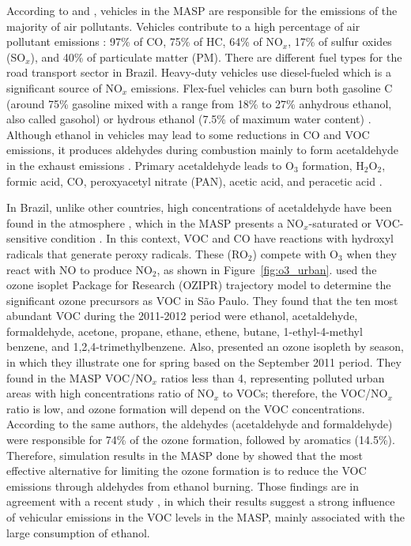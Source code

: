 According to \citet{CETESB2019a} and \citet{Andrade2017}, vehicles in the MASP are responsible for the emissions of the majority of air pollutants.
Vehicles contribute to a high percentage of air pollutant emissions \citep{CETESB2019a}: 97\% of CO, 75\% of HC, 64\% of NO$_x$, 17\% of sulfur oxides (SO$_x$), and 40\% of particulate matter (PM).
There are different fuel types for the road transport sector in Brazil.
Heavy-duty vehicles use diesel-fueled which is a significant source of NO$_x$ emissions.
Flex-fuel vehicles can burn both gasoline C (around 75\% gasoline mixed with a range from 18\% to 27\% anhydrous ethanol, also called gasohol) or hydrous ethanol (7.5\% of maximum water content) \citep{CETESB2019a}.
Although ethanol in vehicles may lead to some reductions in CO and VOC emissions, it produces aldehydes during combustion mainly to form acetaldehyde in the exhaust emissions \citep{Gaffney2009}.
Primary acetaldehyde leads to O$_3$ formation, H$_2$O$_2$, formic acid, CO, peroxyacetyl nitrate (PAN), acetic acid, and peracetic acid \citep{Gaffney2009}.

In Brazil, unlike other countries, high concentrations of acetaldehyde have been found in the atmosphere \citep{Nogueira2014}, which in the MASP presents a NO$_x$-saturated or VOC-sensitive condition \citep{Sanchez-Ccoyllo2006, Alvim2018}.
In this context, VOC and CO have reactions with hydroxyl radicals that generate peroxy radicals. 
These (RO$_2$) compete with O$_3$ when they react with NO to produce NO$_2$, as shown in Figure~\ref{fig:o3_urban}.
\citet{Alvim2018} used the ozone isoplet Package for Research (OZIPR) trajectory model to determine the significant ozone precursors as VOC in S\~{a}o Paulo. 
They found that the ten most abundant VOC during the 2011-2012 period were ethanol, acetaldehyde, formaldehyde, acetone, propane, ethane, ethene, butane, 1-ethyl-4-methyl benzene, and 1,2,4-trimethylbenzene. 
Also, \citet{Alvim2018} presented an ozone isopleth by season, in which they illustrate one for spring based on the September 2011 period.
They found in the MASP VOC/NO$_x$ ratios less than 4, representing polluted urban areas with high concentrations ratio of NO$_x$ to VOCs; therefore, the VOC/NO$_x$ ratio is low, and ozone formation will depend on the VOC concentrations.
According to the same authors, the aldehydes (acetaldehyde and formaldehyde) were responsible for 74\% of the ozone formation, followed by aromatics (14.5\%). 
Therefore, simulation results in the MASP done by \citet{Alvim2018} showed that the most effective alternative for limiting the ozone formation is to reduce the VOC emissions through aldehydes from ethanol burning.
Those findings are in agreement with a recent study \citep{Dominutti2020}, in which their results suggest a strong influence of vehicular emissions in the VOC levels in the MASP, mainly associated with the large consumption of ethanol.

